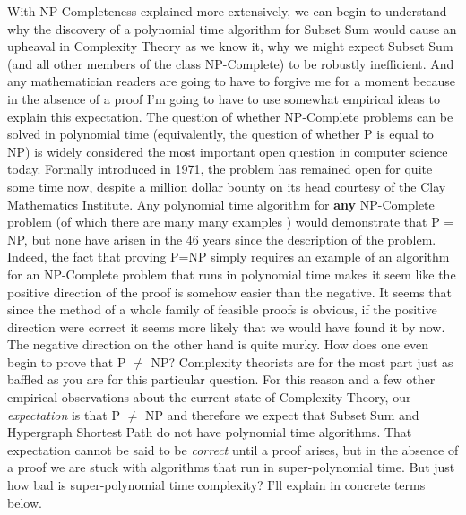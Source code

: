 \documentclass[12pt,twoside]{reedthesis}
\begin{document}
With NP-Completeness explained more extensively, we can begin to understand why the discovery of a polynomial time algorithm for Subset Sum would cause an upheaval in Complexity Theory as we know it, why we might expect Subset Sum (and all other members of the class NP-Complete) to be robustly inefficient. And any mathematician readers are going to have to forgive me for a moment because in the absence of a proof I'm going to have to use somewhat empirical ideas to explain this expectation. The question of whether NP-Complete problems can be solved in polynomial time (equivalently, the question of whether P is equal to NP) is widely considered the most important open question in computer science today. Formally introduced in 1971, the problem has remained open for quite some time now, despite a million dollar bounty on its head courtesy of the Clay Mathematics Institute. Any polynomial time algorithm for \textbf{any} NP-Complete problem (of which there are many many examples ) would demonstrate that P = NP, but none have arisen in the 46 years since the description of the problem. Indeed, the fact that proving P=NP simply requires an example of an algorithm for an NP-Complete problem that runs in polynomial time makes it seem like the positive direction of the proof is somehow easier than the negative. It seems that since the method of a whole family of feasible proofs is obvious, if the positive direction were correct it seems more likely that we would have found it by now. The negative direction on the other hand is quite murky. How does one even begin to prove that P $\neq$ NP? Complexity theorists are for the most part just as baffled as you are for this particular question. For this reason and a few other empirical observations about the current state of Complexity Theory, our \textit{expectation} is that P $\neq$ NP and therefore we expect that Subset Sum and Hypergraph Shortest Path do not have polynomial time algorithms. That expectation cannot be said to be \textit{correct} until a proof arises, but in the absence of a proof we are stuck with algorithms that run in super-polynomial time. But just how bad is super-polynomial time complexity? I'll explain in concrete terms below.
\end{document}
